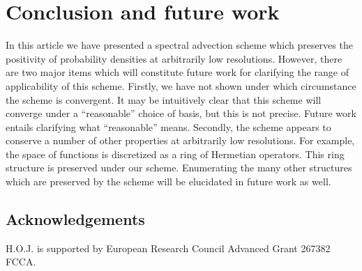 \documentclass[letterpaper, 12 pt]{amsart}
\begin{document}
\section{Conclusion and future work}
In this article we have presented a spectral advection scheme which preserves the positivity of probability densities at arbitrarily low resolutions.
However, there are two major items which will constitute future work
for clarifying the range of applicability of this scheme.
Firstly, we have not shown under which circumstance the scheme is
 convergent.
It may be intuitively clear that this scheme will converge
under a ``reasonable'' choice of basis, but this is not precise.
Future work entails clarifying what ``reasonable'' means.
Secondly, the scheme appears to conserve a number of other
properties at arbitrarily low resolutions.
For example, the space of functions is discretized as
a ring of Hermetian operators.
This ring structure is preserved under our scheme.
Enumerating the many other structures which are preserved 
by the scheme will be elucidated in future work as well.


\subsection{Acknowledgements}
H.O.J. is supported by European Research Council Advanced Grant 267382 FCCA.




\end{document}
